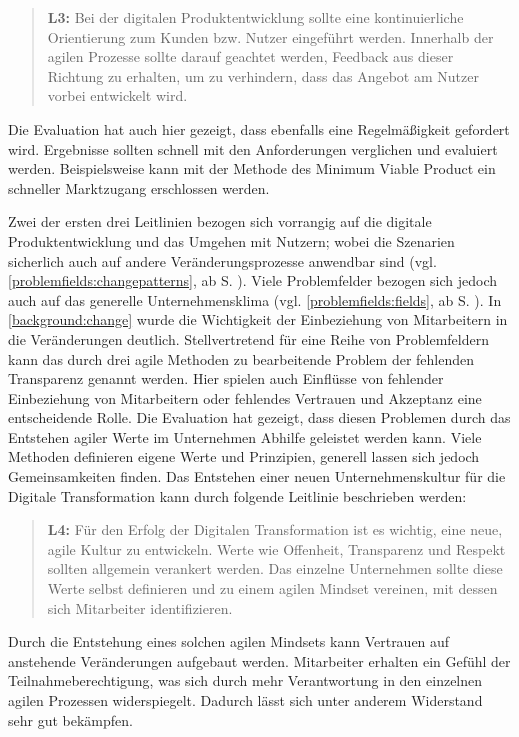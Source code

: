 \begin{quote}
	\textbf{L3:} Bei der digitalen Produktentwicklung sollte eine kontinuierliche Orientierung zum Kunden bzw. Nutzer eingeführt werden. Innerhalb der agilen Prozesse sollte darauf geachtet werden, Feedback aus dieser Richtung zu erhalten, um zu verhindern, dass das Angebot am Nutzer vorbei entwickelt wird.
\end{quote}

Die Evaluation hat auch hier gezeigt, dass ebenfalls eine Regelmäßigkeit gefordert wird. Ergebnisse sollten schnell mit den Anforderungen verglichen und evaluiert werden. Beispielsweise kann mit der Methode des Minimum Viable Product ein schneller Marktzugang erschlossen werden.

Zwei der ersten drei Leitlinien bezogen sich vorrangig auf die digitale Produktentwicklung und das Umgehen mit Nutzern; wobei die Szenarien sicherlich auch auf andere Veränderungsprozesse anwendbar sind (vgl. \ref{problemfields:changepatterns}, ab S. \pageref{problemfields:changepatterns}). Viele Problemfelder bezogen sich jedoch auch auf das generelle Unternehmensklima (vgl. \ref{problemfields:fields}, ab S. \pageref{problemfields:fields}). In \ref{background:change} wurde die Wichtigkeit der Einbeziehung von Mitarbeitern in die Veränderungen deutlich. Stellvertretend für eine Reihe von Problemfeldern kann das durch drei agile Methoden zu bearbeitende Problem der fehlenden Transparenz genannt werden. Hier spielen auch Einflüsse von fehlender Einbeziehung von Mitarbeitern oder fehlendes Vertrauen und Akzeptanz eine entscheidende Rolle. Die Evaluation hat gezeigt, dass diesen Problemen durch das Entstehen agiler Werte im Unternehmen Abhilfe geleistet werden kann. Viele Methoden definieren eigene Werte und Prinzipien, generell lassen sich jedoch Gemeinsamkeiten finden. Das Entstehen einer neuen Unternehmenskultur für die Digitale Transformation kann durch folgende Leitlinie beschrieben werden:

\begin{quote}
	\textbf{L4:} Für den Erfolg der Digitalen Transformation ist es wichtig, eine neue, agile Kultur zu entwickeln. Werte wie Offenheit, Transparenz und Respekt sollten allgemein verankert werden. Das einzelne Unternehmen sollte diese Werte selbst definieren und zu einem agilen Mindset vereinen, mit dessen sich Mitarbeiter identifizieren.
\end{quote}

Durch die Entstehung eines solchen agilen Mindsets kann Vertrauen auf anstehende Veränderungen aufgebaut werden. Mitarbeiter erhalten ein Gefühl der Teilnahmeberechtigung, was sich durch mehr Verantwortung in den einzelnen agilen Prozessen widerspiegelt. Dadurch lässt sich unter anderem Widerstand sehr gut bekämpfen.

